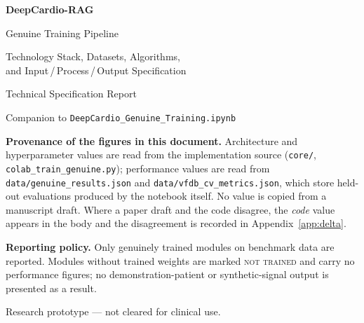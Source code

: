 \documentclass[11pt,a4paper]{article}
\newcommand{\code}[1]{\texttt{\small #1}}
\begin{document}
\begin{titlepage}
\centering
\vspace*{2.2cm}
{\Huge\bfseries\color{dcblue} DeepCardio-RAG\par}
\vspace{0.6cm}
{\LARGE Genuine Training Pipeline\par}
\vspace{0.35cm}
{\large Technology Stack, Datasets, Algorithms,\\[2pt]
and Input\,/\,Process\,/\,Output Specification\par}
\vspace{1.1cm}
{\large Technical Specification Report\par}
\vspace{0.25cm}
{\color{dcgrey}Companion to \code{DeepCardio\_Genuine\_Training.ipynb}\par}
\vspace{2.0cm}

\begin{minipage}{0.86\textwidth}
\begin{notebox}
\textbf{Provenance of the figures in this document.} Architecture and
hyperparameter values are read from the implementation source
(\code{core/}, \code{colab\_train\_genuine.py}); performance values are read
from \code{data/genuine\_results.json} and
\code{data/vfdb\_cv\_metrics.json}, which store held-out evaluations
produced by the notebook itself. No value is copied from a manuscript
draft. Where a paper draft and the code disagree, the \emph{code} value
appears in the body and the disagreement is recorded in
Appendix~\ref{app:delta}.

\medskip
\textbf{Reporting policy.} Only genuinely trained modules on benchmark data
are reported. Modules without trained weights are marked
\textsc{not trained} and carry no performance figures; no demonstration-patient
or synthetic-signal output is presented as a result.
\end{notebox}
\end{minipage}

\vfill
{\color{dcgrey}\small Research prototype --- not cleared for clinical use.\par}
\vspace{0.8cm}
\end{titlepage}

\tableofcontents
\newpage

\end{document}

